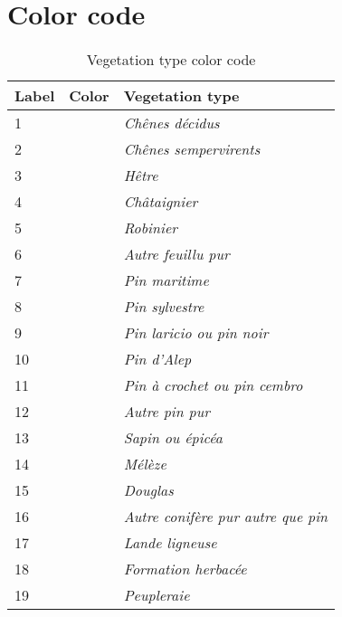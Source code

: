 
\chapter{Color code} %

\label{AppendixA} %

\begin{table}
\begin{center}
\begin{tabular}{l l l}
Label & Color & Vegetation type \\
\hline
1 & \p[l1] & {\textit{Chênes décidus}} \\
2 & \p[l2] & {\textit{Chênes sempervirents}} \\
3 & \p[l3] & {\textit{Hêtre}} \\
4 & \p[l4] & {\textit{Châtaignier}} \\
5 & \p[l5] & {\textit{Robinier}} \\
6 & \p[l6] & {\textit{Autre feuillu pur}} \\
7 & \p[l7] & {\textit{Pin maritime}} \\
8 & \p[l8] & {\textit{Pin sylvestre}} \\
9 & \p[l9] & {\textit{Pin laricio ou pin noir}} \\
10 & \p[l10] & {\textit{Pin d'Alep}} \\
11 & \p[l11] & {\textit{Pin à crochet ou pin cembro}} \\
12 & \p[l12] & {\textit{Autre pin pur}} \\
13 & \p[l13] & {\textit{Sapin ou épicéa}} \\
14 & \p[l14] & {\textit{Mélèze}} \\
15 & \p[l15] & {\textit{Douglas}} \\
16 & \p[l16] & {\textit{Autre conifère pur autre que pin}} \\
17 & \p[l17] & {\textit{Lande ligneuse}} \\
18 & \p[l18] & {\textit{Formation herbacée}} \\
19 & \p[l19] & {\textit{Peupleraie}} \\
\end{tabular}
\end{center}
\caption{Vegetation type color code}
\end{table}